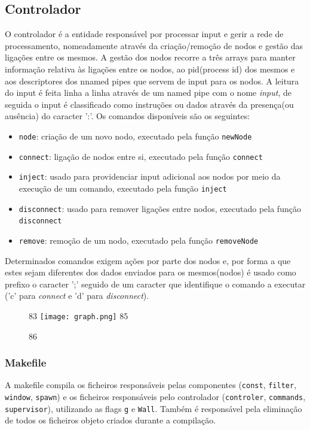 \documentclass[12pt]{article}
\begin{document}
\subsection{Controlador}
O controlador é a entidade responsável por processar input e gerir a rede de processamento, nomeadamente através da criação/remoção de nodos e gestão das ligações entre os mesmos.
A gestão dos nodos recorre a três arrays para manter informação relativa às ligações entre os nodos, ao pid(process id) dos mesmos e aos descriptores dos nnamed pipes que servem de input para os nodos.
A leitura do input é feita linha a linha através de um named pipe com o nome \textit{input}, de seguida o input é classificado como instruções ou dados através da presença(ou ausência) do caracter ':'.
Os comandos disponíveis são os seguintes:
\begin{itemize}
\item \texttt{node}: criação de um novo nodo, executado pela função \texttt{newNode}
\item \texttt{connect}: ligação de nodos entre si, executado pela função \texttt{connect}
\item \texttt{inject}: usado para providenciar input adicional aos nodos por meio da execução de um comando, executado pela função \texttt{inject}
\item \texttt{disconnect}: usado para remover ligações entre nodos, executado pela função \texttt{disconnect}
\item \texttt{remove}: remoção de um nodo, executado pela função \texttt{removeNode}
\end{itemize}
Determinados comandos exigem ações por parte dos nodos e, por forma a que estes sejam diferentes dos dados enviados para os mesmos(nodos) é usado como prefixo o caracter ';' seguido de um caracter que identifique o comando a executar ('c' para \textit{connect} e 'd' para \textit{disconnect}).

\begin{figure}[ht!]
 83              \texttt{[image: graph.png]}
 85     \caption{}
 86 \end{figure}


\subsubsection{Makefile}
A makefile compila os ficheiros responsáveis pelas componentes (\texttt{const},  \texttt{filter}, \texttt{window}, \texttt{spawn}) e os ficheiros responsáveis pelo controlador (\texttt{controler}, \texttt{commands}, \texttt{supervisor}), utilizando as flags \texttt{g} e \texttt{Wall}. Também é responsável pela eliminação de todos os ficheiros objeto criados durante a compilação.
\end{document}
